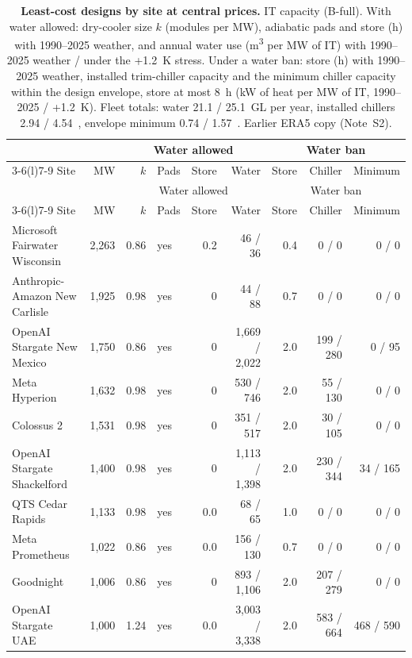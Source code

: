 {\scriptsize\setlength{\tabcolsep}{3pt}
\begin{longtable}{@{}lrrlrrrrr@{}}
\caption{\textbf{Least-cost designs by site at central prices.} IT capacity (B-full). With water allowed: dry-cooler size $k$ (modules per MW), adiabatic pads and store (h) with 1990--2025 weather, and annual water use (m\textsuperscript{3} per MW of IT) with 1990--2025 weather / under the +1.2~K stress. Under a water ban: store (h) with 1990--2025 weather, installed trim-chiller capacity and the minimum chiller capacity within the design envelope, store at most 8~h (kW of heat per MW of IT, 1990--2025 / +1.2~K). Fleet totals: water 21.1 / 25.1~GL per year, installed chillers 2.94 / 4.54~\GWth{}, envelope minimum 0.74 / 1.57~\GWth{}. Earlier ERA5 copy (Note~S2).}\label{tab:s5}\\
\toprule
& & \multicolumn{4}{c}{Water allowed} & \multicolumn{3}{c}{Water ban}\\
\cmidrule(lr){3-6}\cmidrule(l){7-9}
Site & MW & $k$ & Pads & Store & Water & Store & Chiller & Minimum\\
\midrule
\endfirsthead
\toprule
& & \multicolumn{4}{c}{Water allowed} & \multicolumn{3}{c}{Water ban}\\
\cmidrule(lr){3-6}\cmidrule(l){7-9}
Site & MW & $k$ & Pads & Store & Water & Store & Chiller & Minimum\\
\midrule
\endhead
\bottomrule
\endfoot
Microsoft Fairwater Wisconsin & 2,263 & 0.86 & yes & 0.2 & 46 / 36 & 0.4 & 0 / 0 & 0 / 0 \\
Anthropic-Amazon New Carlisle & 1,925 & 0.98 & yes & 0 & 44 / 88 & 0.7 & 0 / 0 & 0 / 0 \\
OpenAI Stargate New Mexico & 1,750 & 0.86 & yes & 0 & 1,669 / 2,022 & 2.0 & 199 / 280 & 0 / 95 \\
Meta Hyperion & 1,632 & 0.98 & yes & 0 & 530 / 746 & 2.0 & 55 / 130 & 0 / 0 \\
Colossus 2 & 1,531 & 0.98 & yes & 0 & 351 / 517 & 2.0 & 30 / 105 & 0 / 0 \\
OpenAI Stargate Shackelford & 1,400 & 0.98 & yes & 0 & 1,113 / 1,398 & 2.0 & 230 / 344 & 34 / 165 \\
QTS Cedar Rapids & 1,133 & 0.98 & yes & 0.0 & 68 / 65 & 1.0 & 0 / 0 & 0 / 0 \\
Meta Prometheus & 1,022 & 0.86 & yes & 0.0 & 156 / 130 & 0.7 & 0 / 0 & 0 / 0 \\
Goodnight & 1,006 & 0.86 & yes & 0 & 893 / 1,106 & 2.0 & 207 / 279 & 0 / 0 \\
OpenAI Stargate UAE & 1,000 & 1.24 & yes & 0.0 & 3,003 / 3,338 & 2.0 & 583 / 664 & 468 / 590 \\

\end{longtable}}
